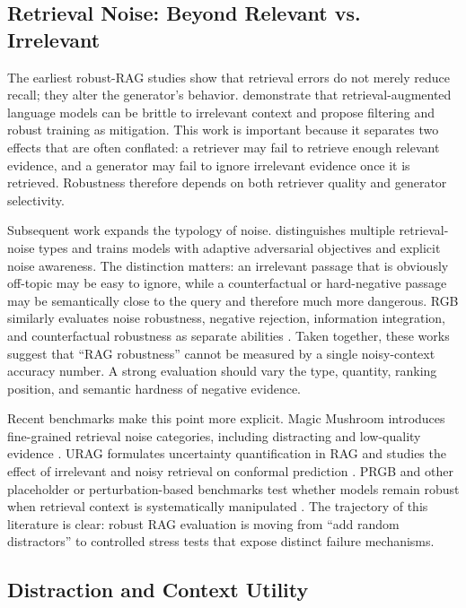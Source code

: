 \documentclass[11pt]{article}
\begin{document}


\subsection{Retrieval Noise: Beyond Relevant vs. Irrelevant}

The earliest robust-RAG studies show that retrieval errors do not merely reduce recall; they alter the generator's behavior. \citet{irrelevantContext2023} demonstrate that retrieval-augmented language models can be brittle to irrelevant context and propose filtering and robust training as mitigation. This work is important because it separates two effects that are often conflated: a retriever may fail to retrieve enough relevant evidence, and a generator may fail to ignore irrelevant evidence once it is retrieved. Robustness therefore depends on both retriever quality and generator selectivity.

Subsequent work expands the typology of noise. \citet{raat2024} distinguishes multiple retrieval-noise types and trains models with adaptive adversarial objectives and explicit noise awareness. The distinction matters: an irrelevant passage that is obviously off-topic may be easy to ignore, while a counterfactual or hard-negative passage may be semantically close to the query and therefore much more dangerous. RGB similarly evaluates noise robustness, negative rejection, information integration, and counterfactual robustness as separate abilities \citep{rgb2023}. Taken together, these works suggest that ``RAG robustness'' cannot be measured by a single noisy-context accuracy number. A strong evaluation should vary the type, quantity, ranking position, and semantic hardness of negative evidence.

Recent benchmarks make this point more explicit. Magic Mushroom introduces fine-grained retrieval noise categories, including distracting and low-quality evidence \citep{rrag027}. URAG formulates uncertainty quantification in RAG and studies the effect of irrelevant and noisy retrieval on conformal prediction \citep{rrag001}. PRGB and other placeholder or perturbation-based benchmarks test whether models remain robust when retrieval context is systematically manipulated \citep{rrag183}. The trajectory of this literature is clear: robust RAG evaluation is moving from ``add random distractors'' to controlled stress tests that expose distinct failure mechanisms.

\subsection{Distraction and Context Utility}
\end{document}
